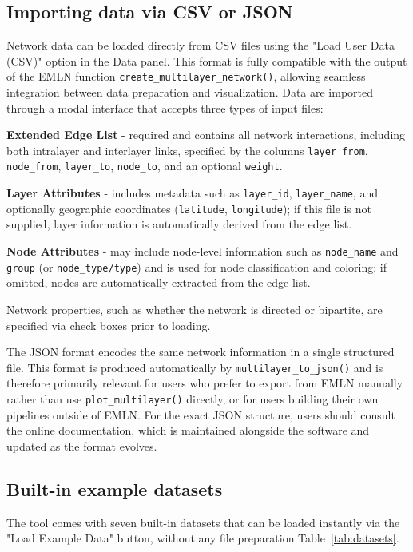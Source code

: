 \documentclass{article}
\begin{document}
\subsection{Importing data via CSV or JSON}

Network data can be loaded directly from CSV files using the "Load User Data (CSV)" option in the Data panel. This format is fully compatible with the output of the EMLN function \texttt{create\_multilayer\_network()}, allowing seamless integration between data preparation and visualization. Data are imported through a modal interface that accepts three types of input files:

\textbf{Extended Edge List} - required and contains all network interactions, including both intralayer and interlayer links, specified by the columns \texttt{layer\_from}, \texttt{node\_from}, \texttt{layer\_to}, \texttt{node\_to}, and an optional \texttt{weight}. 

\textbf{Layer Attributes} -  includes metadata such as \texttt{layer\_id}, \texttt{layer\_name}, and optionally geographic coordinates (\texttt{latitude}, \texttt{longitude}); if this file is not supplied, layer information is automatically derived from the edge list. 

\textbf{Node Attributes} - may include node-level information such as \texttt{node\_name} and \texttt{group} (or \texttt{node\_type/type}) and is used for node classification and coloring; if omitted, nodes are automatically extracted from the edge list.  

Network properties, such as whether the network is directed or bipartite, are specified via check boxes prior to loading.

The JSON format encodes the same network information in a single structured file. This format is produced automatically by \texttt{multilayer_to_json()} and is therefore primarily relevant for users who prefer to export from EMLN manually rather than use \texttt{plot_multilayer()} directly, or for users building their own pipelines outside of EMLN. For the exact JSON structure, users should consult the online documentation, which is maintained alongside the software and updated as the format evolves.

\subsection{Built-in example datasets}

The tool comes with seven built-in datasets that can be loaded instantly via the "Load Example Data" button, without any file preparation Table~\ref{tab:datasets}.
\end{document}
